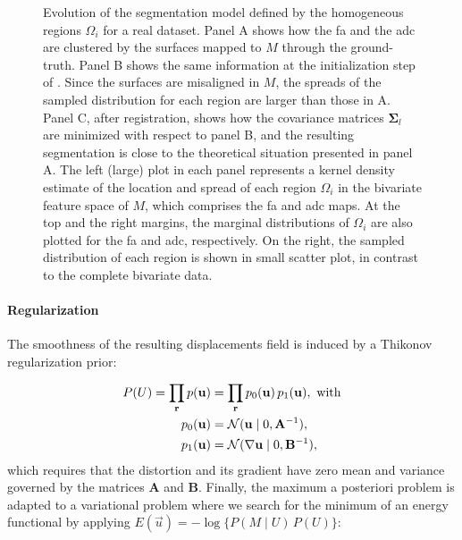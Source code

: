 \begin{figure}

\caption{%
Evolution of the segmentation model defined by the homogeneous regions $\Omega_i$
  for a real dataset.
Panel A shows how the \gls*{fa} and the \gls*{adc} are clustered by the surfaces mapped to
  $M$ through the ground-truth.
Panel B shows the same information at the initialization step of \regseg{}.
Since the surfaces are misaligned in $M$, the spreads of the sampled distribution for
  each region are larger than those in A.
Panel C, after \regseg{} registration, shows how the covariance matrices $\boldsymbol{\Sigma}_l$
  are minimized with respect to panel B, and the resulting segmentation is close
  to the theoretical situation presented in panel A.
The left (large) plot in each panel represents a kernel density estimate of the location and spread of
  each region $\Omega_i$ in the bivariate feature space of $M$, which comprises
  the \gls*{fa} and \gls*{adc} maps.
At the top and the right margins, the marginal distributions of $\Omega_i$ are also plotted for
  the \gls*{fa} and \gls*{adc}, respectively.
On the right, the sampled distribution of each region is shown in small scatter plot, in contrast to
  the complete bivariate data.
}\label{fig:model}
\end{figure}

\paragraph*{Regularization}
The smoothness of the resulting displacements field is induced by a Thikonov regularization
  prior:

  \begin{align}
  P(U) = \underset{\vec{r}}{\prod}\, p(\vec{u}) &=
  \underset{\vec{r}}{\prod}\, p_0(\vec{u}) \, p_1(\vec{u}), \text{ with} \\
  p_0(\vec{u}) &= \mathcal{N}( \vec{u} \mid 0, \mathbf{A}^{-1}), \notag\\
  p_1(\vec{u}) &= \mathcal{N}(  \nabla \vec{u} \mid 0, \mathbf{B}^{-1}),
  \label{eq:thikonov}
  \end{align}
 which requires that the distortion and its gradient have zero
  mean and variance governed by the matrices $\mathbf{A}$ and $\mathbf{B}$.
Finally, the maximum a posteriori problem is adapted to a variational problem where we search for
  the minimum of an energy functional by applying $E(\vec{u}) = -\log \{P( M \mid U) \, P(U)\}$:


